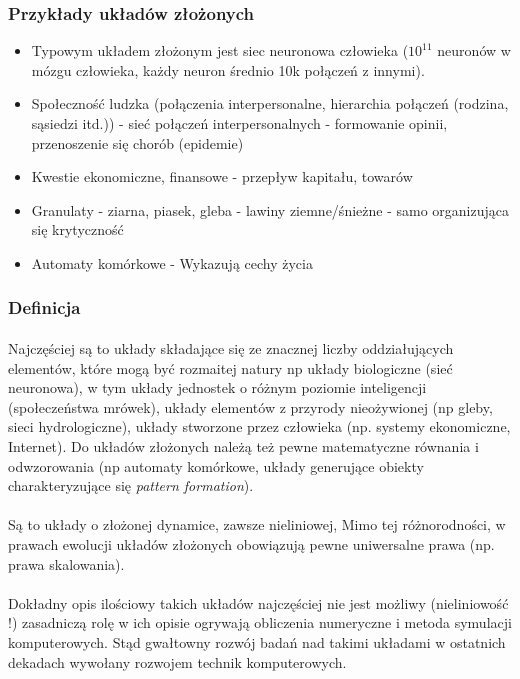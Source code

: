 \documentclass[a4paper,10pt]{article}
\begin{document}
\subsubsection{Przykłady układów złożonych}
\begin{itemize}
\item Typowym układem złożonym jest siec neuronowa człowieka ($10^{11}$ neuronów w mózgu człowieka, każdy neuron średnio 10k połączeń z innymi).
\item Społeczność ludzka (połączenia interpersonalne, hierarchia połączeń (rodzina, sąsiedzi itd.)) - sieć połączeń interpersonalnych - formowanie opinii, przenoszenie się chorób (epidemie)
\item Kwestie ekonomiczne, finansowe - przepływ kapitału, towarów
\item Granulaty - ziarna, piasek, gleba - lawiny ziemne/śnieżne - samo organizująca się krytyczność
\item Automaty komórkowe - Wykazują cechy życia
\end{itemize}

\subsubsection{Definicja}
\paragraph{} Najczęściej są to układy składające się ze znacznej liczby oddziałujących elementów, które mogą być rozmaitej natury np układy biologiczne (sieć neuronowa), w tym układy jednostek o różnym 
poziomie inteligencji (społeczeństwa mrówek), układy elementów z przyrody nieożywionej (np gleby, sieci hydrologiczne), układy stworzone przez człowieka (np. systemy ekonomiczne, Internet). 
Do układów złożonych należą  też pewne matematyczne równania i odwzorowania (np automaty komórkowe, układy generujące obiekty charakteryzujące się \textit{pattern formation}).

\paragraph{} Są to układy o złożonej dynamice, zawsze nieliniowej, Mimo tej różnorodności, w prawach ewolucji układów złożonych obowiązują pewne uniwersalne prawa (np. prawa skalowania).

\paragraph{} Dokładny opis ilościowy takich układów najczęściej nie jest możliwy (nieliniowość !) zasadniczą rolę w ich opisie ogrywają obliczenia numeryczne i metoda symulacji komputerowych. 
Stąd gwałtowny rozwój badań nad takimi układami w ostatnich dekadach wywołany rozwojem technik komputerowych.
\end{document}
